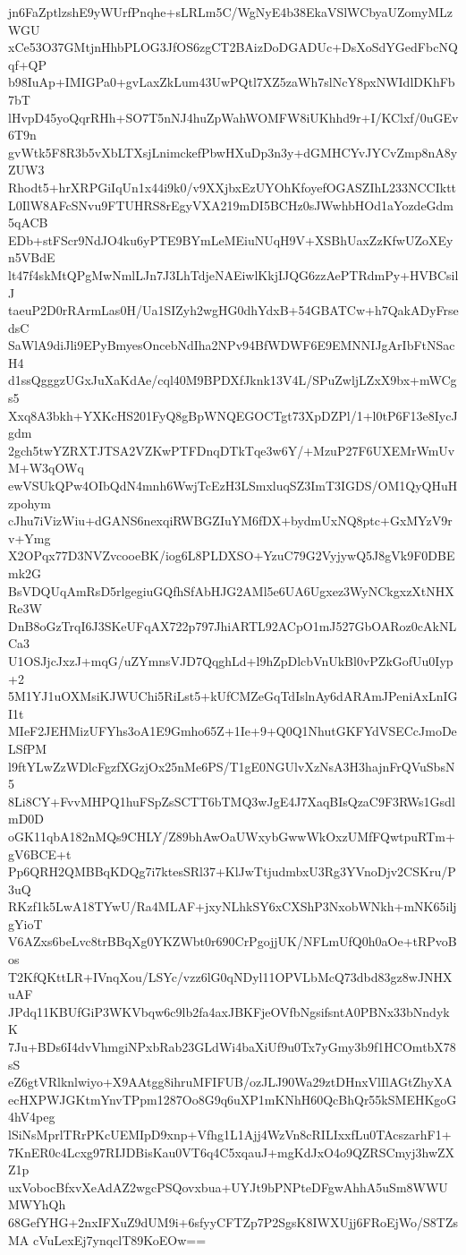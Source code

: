 jn6FaZptlzshE9yWUrfPnqhe+sLRLm5C/WgNyE4b38EkaVSlWCbyaUZomyMLzWGU
xCe53O37GMtjnHhbPLOG3JfOS6zgCT2BAizDoDGADUc+DsXoSdYGedFbcNQqf+QP
b98IuAp+IMIGPa0+gvLaxZkLum43UwPQtl7XZ5zaWh7slNcY8pxNWIdlDKhFb7bT
lHvpD45yoQqrRHh+SO7T5nNJ4huZpWahWOMFW8iUKhhd9r+I/KClxf/0uGEv6T9n
gvWtk5F8R3b5vXbLTXsjLnimckefPbwHXuDp3n3y+dGMHCYvJYCvZmp8nA8yZUW3
Rhodt5+hrXRPGiIqUn1x44i9k0/v9XXjbxEzUYOhKfoyefOGASZIhL233NCCIktt
L0IlW8AFcSNvu9FTUHRS8rEgyVXA219mDI5BCHz0sJWwhbHOd1aYozdeGdm5qACB
EDb+stFScr9NdJO4ku6yPTE9BYmLeMEiuNUqH9V+XSBhUaxZzKfwUZoXEyn5VBdE
lt47f4skMtQPgMwNmlLJn7J3LhTdjeNAEiwlKkjIJQG6zzAePTRdmPy+HVBCsilJ
taeuP2D0rRArmLas0H/Ua1SIZyh2wgHG0dhYdxB+54GBATCw+h7QakADyFrsedsC
SaWlA9diJli9EPyBmyesOncebNdIha2NPv94BfWDWF6E9EMNNIJgArIbFtNSacH4
d1ssQgggzUGxJuXaKdAe/cql40M9BPDXfJknk13V4L/SPuZwljLZxX9bx+mWCgs5
Xxq8A3bkh+YXKcHS201FyQ8gBpWNQEGOCTgt73XpDZPl/1+l0tP6F13e8IycJgdm
2gch5twYZRXTJTSA2VZKwPTFDnqDTkTqe3w6Y/+MzuP27F6UXEMrWmUvM+W3qOWq
ewVSUkQPw4OIbQdN4mnh6WwjTcEzH3LSmxluqSZ3ImT3IGDS/OM1QyQHuHzpohym
cJhu7iVizWiu+dGANS6nexqiRWBGZIuYM6fDX+bydmUxNQ8ptc+GxMYzV9rv+Ymg
X2OPqx77D3NVZvcooeBK/iog6L8PLDXSO+YzuC79G2VyjywQ5J8gVk9F0DBEmk2G
BsVDQUqAmRsD5rlgegiuGQfhSfAbHJG2AMl5e6UA6Ugxez3WyNCkgxzXtNHXRe3W
DnB8oGzTrqI6J3SKeUFqAX722p797JhiARTL92ACpO1mJ527GbOARoz0cAkNLCa3
U1OSJjcJxzJ+mqG/uZYmnsVJD7QqghLd+l9hZpDlcbVnUkBl0vPZkGofUu0Iyp+2
5M1YJ1uOXMsiKJWUChi5RiLst5+kUfCMZeGqTdIslnAy6dARAmJPeniAxLnIGI1t
MIeF2JEHMizUFYhs3oA1E9Gmho65Z+1Ie+9+Q0Q1NhutGKFYdVSECcJmoDeLSfPM
l9ftYLwZzWDlcFgzfXGzjOx25nMe6PS/T1gE0NGUlvXzNsA3H3hajnFrQVuSbsN5
8Li8CY+FvvMHPQ1huFSpZsSCTT6bTMQ3wJgE4J7XaqBIsQzaC9F3RWs1GsdlmD0D
oGK11qbA182nMQs9CHLY/Z89bhAwOaUWxybGwwWkOxzUMfFQwtpuRTm+gV6BCE+t
Pp6QRH2QMBBqKDQg7i7ktesSRl37+KlJwTtjudmbxU3Rg3YVnoDjv2CSKru/P3uQ
RKzf1k5LwA18TYwU/Ra4MLAF+jxyNLhkSY6xCXShP3NxobWNkh+mNK65iljgYioT
V6AZxs6beLvc8trBBqXg0YKZWbt0r690CrPgojjUK/NFLmUfQ0h0aOe+tRPvoBos
T2KfQKttLR+IVnqXou/LSYc/vzz6lG0qNDyl11OPVLbMcQ73dbd83gz8wJNHXuAF
JPdq11KBUfGiP3WKVbqw6c9lb2fa4axJBKFjeOVfbNgsifsntA0PBNx33bNndykK
7Ju+BDs6I4dvVhmgiNPxbRab23GLdWi4baXiUf9u0Tx7yGmy3b9f1HCOmtbX78sS
eZ6gtVRlknlwiyo+X9AAtgg8ihruMFIFUB/ozJLJ90Wa29ztDHnxVlIlAGtZhyXA
ecHXPWJGKtmYnvTPpm1287Oo8G9q6uXP1mKNhH60QcBhQr55kSMEHKgoG4hV4peg
lSiNsMprlTRrPKcUEMIpD9xnp+Vfhg1L1Ajj4WzVn8cRILIxxfLu0TAcszarhF1+
7KnER0c4Lcxg97RIJDBisKau0VT6q4C5xqauJ+mgKdJxO4o9QZRSCmyj3hwZXZ1p
uxVobocBfxvXeAdAZ2wgcPSQovxbua+UYJt9bPNPteDFgwAhhA5uSm8WWUMWYhQh
68GefYHG+2nxIFXuZ9dUM9i+6sfyyCFTZp7P2SgsK8IWXUjj6FRoEjWo/S8TZsMA
cVuLexEj7ynqclT89KoEOw==
